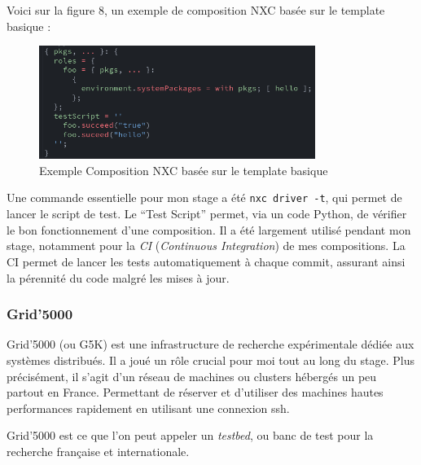 \documentclass[a4paper,french,12pt, titlepage]{article}
\begin{document}
Voici sur la figure 8, un exemple de composition NXC basée sur le
template basique :

\begin{figure}[h]
\centering
\includegraphics[width=0.8\textwidth,height=0.8\textheight,keepaspectratio]{images/template-hellow.png}
\caption{Exemple Composition NXC basée sur le template basique}
\end{figure}

Une commande essentielle pour mon stage a été \texttt{nxc\ driver\ -t},
qui permet de lancer le script de test. Le ``Test Script'' permet, via
un code Python, de vérifier le bon fonctionnement d'une composition. Il
a été largement utilisé pendant mon stage, notamment pour la \emph{CI}
(\emph{Continuous Integration}) de mes compositions. La CI permet de
lancer les tests automatiquement à chaque commit, assurant ainsi la
pérennité du code malgré les mises à jour.\newline

\hypertarget{grid5000}{%
\subsubsection{Grid'5000}\label{grid5000}}

Grid'5000 (ou G5K) est une infrastructure de recherche expérimentale
dédiée aux systèmes distribués. Il a joué un rôle crucial pour moi tout
au long du stage. Plus précisément, il s'agit d'un réseau de machines ou
clusters hébergés un peu partout en France. Permettant de réserver et
d'utiliser des machines hautes performances rapidement en utilisant une
connexion ssh.

Grid'5000 est ce que l'on peut appeler un \emph{testbed}, ou banc de
test pour la recherche française et internationale.\newline
\end{document}
